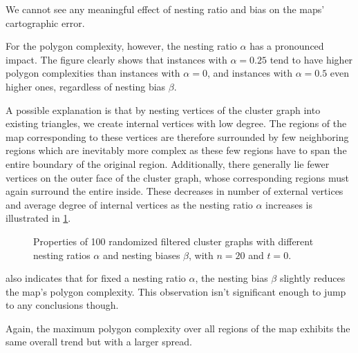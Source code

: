 We cannot see any meaningful effect of nesting ratio and bias on the maps' cartographic error.

For the polygon complexity, however, the nesting ratio $\alpha$ has a pronounced impact.
The figure clearly shows that instances with $\alpha = 0.25$ tend to have higher polygon complexities than instances with $\alpha = 0$, and instances with $\alpha = 0.5$ even higher ones, regardless of nesting bias $\beta$.

A possible explanation is that by nesting vertices of the cluster graph into existing triangles, we create internal vertices with low degree.
The regions of the map corresponding to these vertices are therefore surrounded by few neighboring regions which are inevitably more complex as these few regions have to span the entire boundary of the original region.
Additionally, there generally lie fewer vertices on the outer face of the cluster graph, whose corresponding regions must again surround the entire inside.
These decreases in number of external vertices and average degree of internal vertices as the nesting ratio $\alpha$ increases is illustrated in \cref{fig:experimental-evaluation-variable-nesting-ratio-and-bias-2}.

\begin{figure}[H]
	\centering
	\quad
	\caption{Properties of 100 randomized filtered cluster graphs  with different nesting ratios $\alpha$ and nesting biases $\beta$, with $n = 20$ and $t = 0$.}
	\label{fig:experimental-evaluation-variable-nesting-ratio-and-bias-2}
\end{figure}

 also indicates that for fixed a nesting ratio $\alpha$, the nesting bias $\beta$ slightly reduces the map's polygon complexity.
This observation isn't significant enough to jump to any conclusions though.

Again, the maximum polygon complexity over all regions of the map exhibits the same overall trend but with a larger spread.
